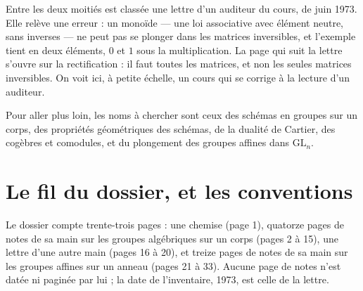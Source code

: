 \documentclass[11pt,a4paper]{article}
\begin{document}
\begin{resume}
Entre les deux moitiés est classée une lettre d'un auditeur du cours, de juin
1973. Elle relève une erreur : un monoïde --- une loi associative avec
élément neutre, sans inverses --- ne peut pas se plonger dans les matrices
inversibles, et l'exemple tient en deux éléments, $0$ et $1$ sous la
multiplication. La page qui suit la lettre s'ouvre sur la rectification : il
faut toutes les matrices, et non les seules matrices inversibles. On voit
ici, à petite échelle, un cours qui se corrige à la lecture d'un auditeur.

Pour aller plus loin, les noms à chercher sont ceux des schémas en groupes
sur un corps, des propriétés géométriques des schémas, de la dualité de
Cartier, des cogèbres et comodules, et du plongement des groupes affines
dans $\mathrm{GL}_{n}$.

\end{resume}

\section*{Le fil du dossier, et les conventions}

Le dossier compte trente-trois pages : une chemise (page 1), quatorze pages
de notes de sa main sur les groupes algébriques sur un corps (pages 2 à 15),
une lettre d'une autre main (pages 16 à 20), et treize pages de notes de sa
main sur les groupes affines sur un anneau (pages 21 à 33). Aucune page de
notes n'est datée ni paginée par lui ; la date de l'inventaire, 1973, est
celle de la lettre.
\end{document}
